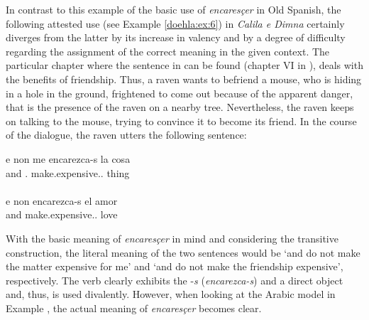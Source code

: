 \documentclass[output=paper]{langscibook}
\begin{document}
In contrast to this example of the basic use of \textit{encaresçer} in Old Spanish, the following attested use (see Example \ref{doehla:ex:6}) in \textit{Calila e Dimna} certainly diverges from the latter by its increase in valency and by a degree of difficulty regarding the assignment of the correct meaning in the given context. The particular chapter where the sentence in  can be found (chapter VI in \citealt{dohla_libro_2009}), deals with the benefits of friendship. Thus, a raven wants to befriend a mouse, who is hiding in a hole in the ground, frightened to come out because of the apparent danger, that is the presence of the raven on a nearby tree. Nevertheless, the raven keeps on talking to the mouse, trying to convince it to become its friend. In the course of the dialogue, the raven utters the following sentence:

\begin{exe}
    \ex\label{doehla:ex:6}
    \begin{xlist}
        \ex
        \gll e non me encarezca-s la cosa \\
        and \NEG{} \First\SG.\OBJ{} make.expensive.\PRS.\SG{} \Def{} thing \\
        \glt \citep[AIII.31a]{dohla_libro_2009} \\
        \ex
        \gll e non encarezca-s el {amor\footnotemark[16]} \\
        and \NEG{} make.expensive.\PRS.\SG{} \Def{} love \\
        \glt \citep[BIII.31a]{dohla_libro_2009}
    \end{xlist}
\end{exe}

With the basic meaning of \textit{encaresçer} in mind and considering the transitive construction, the literal meaning of the two sentences would be ‘and do not make the matter expensive for me’ and ‘and do not make the friendship expensive’, respectively. The verb clearly exhibits the \Second\SG{} -\textit{s} (\textit{encarezca-s}) and a direct object and, thus, is used divalently. However, when looking at the Arabic model in Example , the actual meaning of \textit{encaresçer} becomes clear.
\end{document}
